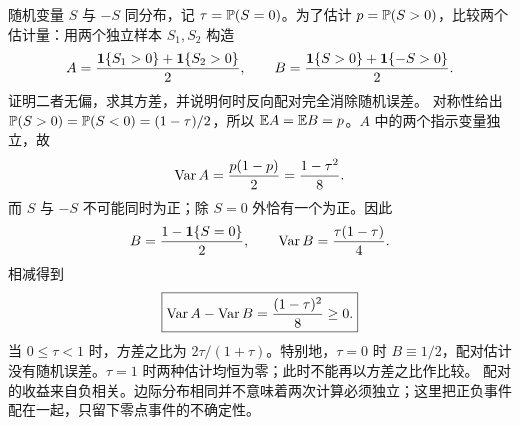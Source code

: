 随机变量 $S$ 与 $-S$ 同分布，记 $\tau=\mathbb{P}(S=0)$。为了估计 $p=\mathbb{P}(S>0)$，比较两个估计量：用两个独立样本 $S_1,S_2$ 构造
\[
A=\frac{\mathbf{1}\{S_1>0\}+\mathbf{1}\{S_2>0\}}2,
\qquad B=\frac{\mathbf{1}\{S>0\}+\mathbf{1}\{-S>0\}}2.
\]
证明二者无偏，求其方差，并说明何时反向配对完全消除随机误差。
\solution 对称性给出 $\mathbb{P}(S>0)=\mathbb{P}(S<0)=(1-\tau)/2$，所以 $\mathbb{E} A=\mathbb{E} B=p$。$A$ 中的两个指示变量独立，故
\[
\operatorname{Var} A=\frac{p(1-p)}2=\frac{1-\tau^2}{8}.
\]
而 $S$ 与 $-S$ 不可能同时为正；除 $S=0$ 外恰有一个为正。因此
\[
B=\frac{1-\mathbf{1}\{S=0\}}2,
\qquad \operatorname{Var} B=\frac{\tau(1-\tau)}4.
\]
相减得到
\[
\boxed{\operatorname{Var} A-\operatorname{Var} B=\frac{(1-\tau)^2}{8}\ge0.}
\]
当 $0\le\tau<1$ 时，方差之比为 $2\tau/(1+\tau)$。特别地，$\tau=0$ 时 $B\equiv1/2$，配对估计没有随机误差。$\tau=1$ 时两种估计均恒为零；此时不能再以方差之比作比较。
\insight 配对的收益来自负相关。边际分布相同并不意味着两次计算必须独立；这里把正负事件配在一起，只留下零点事件的不确定性。

